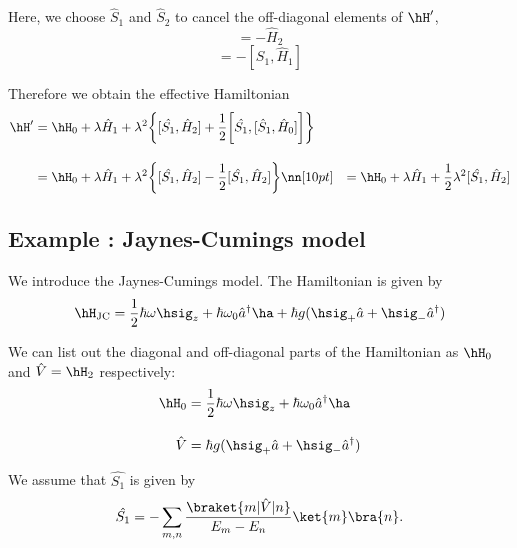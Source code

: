 Here, we choose $\hat{S}_1$ and $\hat{S}_2$ to cancel the off-diagonal elements of $\hH^{\prime}$, 
\begin{equation}
    [\hat{S_1}, \hH_0]=-\hat{H}_2
\end{equation}
\begin{equation}
    [\hat{S_2}, \hH_0]
    =-[\hat{S_1}, \hat{H}_1]
\end{equation}

Therefore we obtain the effective Hamiltonian
\begin{align}
    \hH^{\prime}
    &=\hH_0 + \lambda\hat{H}_1
    +\lambda^2
    \biggl\{
    [\hat{S_1}, \hat{H}_2]
    +\frac{1}{2}\biggl[
    \hat{S_1}, [\hat{S}_{1}, \hat{H}_0]
    \biggr]
    \biggr\}\\[10pt]
    &=\hH_0 + \lambda\hat{H}_1
    +\lambda^2
    \biggl\{
    [\hat{S_1}, \hat{H}_2]
    -\frac{1}{2}[
    \hat{S_1}, \hat{H}_2
    ]
    \biggr\}\nn[10pt]
    &=\hH_0 + \lambda\hat{H}_1
    +\frac{1}{2}\lambda^2
    [\hat{S_1}, \hat{H}_2]
\end{align}

\subsection{Example : Jaynes-Cumings model}
We introduce the Jaynes-Cumings model.
The Hamiltonian is given by
\begin{equation}
    \hH_{\rm{JC}}
    =\frac{1}{2}\hbar\omega\hsig_z
    +\hbar\omega_0\hat{a}^\dagger\ha
    +\hbar g(\hsig_+\hat{a}+\hsig_-\hat{a}^\dagger)
\end{equation}

We can list out the diagonal and off-diagonal parts of the Hamiltonian as $\hH_0$ and $\hat{V}=\hH_2$ respectively:
\begin{align}
    \hH_0&=\frac{1}{2}\hbar\omega\hsig_z
    +\hbar\omega_0\hat{a}^\dagger\ha\\[10pt]
    \hat{V}&=\hbar g(\hsig_+\hat{a}+\hsig_-\hat{a}^\dagger)
\end{align}

We assume that $\hat{S_{1}}$ is given by
\begin{equation}
    \hat{S_{1}}=-\sum_{m,n}\frac{\braket{m|\hat{V}|n}}{E_{m}-E_{n}}\ket{m}\bra{n}.
\end{equation}

